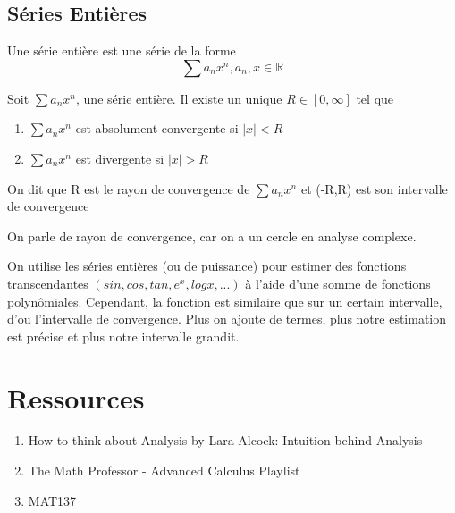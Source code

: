 \documentclass{article}
\begin{document}
\subsection{Séries Entières}

\begin{definition}
    Une série entière est une série de la forme
    $$ \sum a_n x^n, a_n , x \in \mathbb{R}$$
\end{definition}

\begin{theorem}
    Soit $ \sum a_n x^n$, une série entière. Il existe un unique $R \in
    [0, \infty]$ tel que
    \begin{enumerate}
	\item $ \sum a_n x^n$ est absolument convergente si $|x|<R$
	\item $ \sum a_n x^n$ est divergente si $|x|>R$
    \end{enumerate}
    On dit que R est le rayon de convergence de $ \sum a_n x^n$ et (-R,R)
    est son intervalle de convergence
\end{theorem}

\begin{remark}
    On parle de rayon de convergence, car on a un cercle en analyse
    complexe.
\end{remark}

\begin{remark}
    On utilise les séries entières (ou de puissance) pour estimer des
    fonctions transcendantes $(sin, cos, tan, e^x, log x, ...)$ à
    l'aide d'une somme de fonctions polynômiales. Cependant, la fonction
    est similaire que sur un certain intervalle, d'ou l'intervalle de
    convergence. Plus on ajoute de termes, plus notre estimation est
    précise et plus notre intervalle grandit.
\end{remark}

\pagebreak

\section{Ressources}

\begin{enumerate}
    \item How to think about Analysis by Lara Alcock: Intuition behind
	Analysis
    \item The Math Professor - Advanced Calculus Playlist
    \item MAT137
\end{enumerate}
\end{document}
